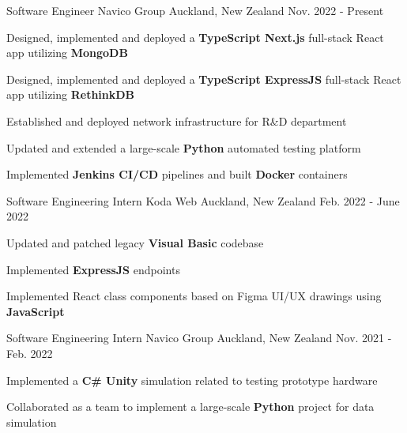 
\begin{cventries}
  \cventry
  {Software Engineer} %
  {Navico Group} %
  {Auckland, New Zealand} %
  {Nov. 2022 - Present} %
  {
    \begin{cvitems} %
      \item Designed, implemented and deployed a \textbf{TypeScript Next.js} full-stack React app utilizing \textbf{MongoDB}
      \item Designed, implemented and deployed a \textbf{TypeScript ExpressJS} full-stack React app utilizing \textbf{RethinkDB}
      \item Established and deployed network infrastructure for R\&D department
      \item Updated and extended a large-scale \textbf{Python} automated testing platform
      \item Implemented \textbf{Jenkins CI/CD} pipelines and built \textbf{Docker} containers
    \end{cvitems}
  }

\cventry
  {Software Engineering Intern} %
  {Koda Web} %
  {Auckland, New Zealand} %
  {Feb. 2022 - June 2022} %
  {
    \begin{cvitems} %
      \item Updated and patched legacy \textbf{Visual Basic} codebase
      \item Implemented \textbf{ExpressJS} endpoints
      \item Implemented React class components based on Figma UI/UX drawings using \textbf{JavaScript}
    \end{cvitems}
  }

\cventry
  {Software Engineering Intern} %
  {Navico Group} %
  {Auckland, New Zealand} %
  {Nov. 2021 - Feb. 2022} %
  {
    \begin{cvitems} %
      \item Implemented a \textbf{C\# Unity} simulation related to testing prototype hardware
      \item Collaborated as a team to implement a large-scale \textbf{Python} project for data simulation
    \end{cvitems}
  }

\end{cventries}
